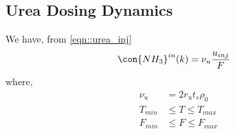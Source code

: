 \subsection{Urea Dosing Dynamics}
We have, from \ref{eqn::urea_inj}
\begin{align}
    \con{NH_3}^{in}(k) &= \nu_u \frac{u_{inj}}{F}
    \label{eqn::urea_parm}
\end{align}
where,
\begin{align*}
    \nu_u &= 2 r_u t_s \rho_0\\
    T_{min} &\leq T \leq T_{max}\\
    F_{min} &\leq F \leq F_{max}
\end{align*}
